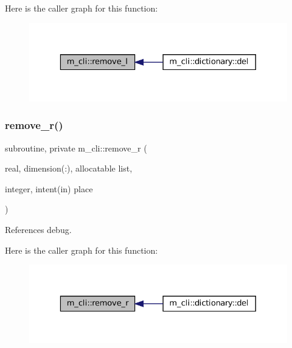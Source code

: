 Here is the caller graph for this function\+:
\nopagebreak
\begin{figure}[H]
\begin{center}
\leavevmode
\includegraphics[width=329pt]{namespacem__cli_a9c86f0f52ce71f14e774fd21f0686cf6_icgraph}
\end{center}
\end{figure}
\mbox{\label{namespacem__cli_a4f47701695b95c88fa4927c04996ce0f}} 
\subsubsection{\texorpdfstring{remove\+\_\+r()}{remove\_r()}}
{\footnotesize\ttfamily subroutine, private m\+\_\+cli\+::remove\+\_\+r (\begin{DoxyParamCaption}\item[{real, dimension(\+:), allocatable}]{list,  }\item[{integer, intent(in)}]{place }\end{DoxyParamCaption})\hspace{0.3cm}{\ttfamily [private]}}



References debug.

Here is the caller graph for this function\+:
\nopagebreak
\begin{figure}[H]
\begin{center}
\leavevmode
\includegraphics[width=329pt]{namespacem__cli_a4f47701695b95c88fa4927c04996ce0f_icgraph}
\end{center}
\end{figure}
\mbox{\label{namespacem__cli_a785aa0016768b6dc2e27c29d5342c329}} 
